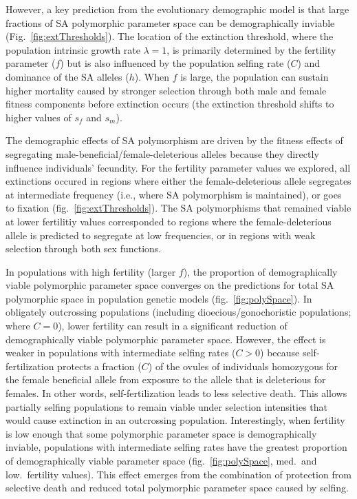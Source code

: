 \documentclass[11pt]{article}
\begin{document}
However, a key prediction from the evolutionary demographic model is that large fractions of SA polymorphic parameter space can be demographically inviable (Fig.~\ref{fig:extThresholds}). The location of the extinction threshold, where the population intrinsic growth rate $\lambda = 1$, is primarily determined by the fertility parameter ($f$) but is also influenced by the population selfing rate ($C$) and dominance of the SA alleles ($h$). When $f$ is large, the population can sustain higher mortality caused by stronger selection through both male and female fitness components before extinction occurs (the extinction threshold shifts to higher values of $s_f$ and $s_m$). 

The demographic effects of SA polymorphism are driven by the fitness effects of segregating male-beneficial/female-deleterious alleles because they directly influence individuals' fecundity. For the fertility parameter values we explored, all extinctions occured in regions where either the female-deleterious allele segregates at intermediate frequency (i.e., where SA polymorphism is maintained), or goes to fixation (fig.~\ref{fig:extThresholds}). The SA polymorphisms that remained viable at lower fertilitiy values corresponded to regions where the female-deleterious allele is predicted to segregate at low frequencies, or in regions with weak selection through both sex functions. 


In populations with high fertility (larger $f$), the proportion of demographically viable polymorphic parameter space converges on the predictions for total SA polymorphic space in population genetic models (fig.~\ref{fig:polySpace}). In obligately outcrossing populations (including dioecious/gonochoristic populations; where $C = 0$), lower fertility can result in a significant reduction of demographically viable polymorphic parameter space. However, the effect is weaker in populations with intermediate selfing rates ($C > 0$) because self-fertilization protects a fraction ($C$) of the ovules of individuals homozygous for the female beneficial allele from exposure to the allele that is deleterious for females. In other words, self-fertilization leads to less selective death. This allows partially selfing populations to remain viable under selection intensities that would cause extinction in an outcrossing population. Interestingly, when fertility is low enough that some polymorphic parameter space is demographically inviable, populations with intermediate selfing rates have the greatest proportion of demographically viable parameter space (fig.~\ref{fig:polySpace}, med.~and low.~fertility values). This effect emerges from the combination of protection from selective death and reduced total polymorphic parameter space caused by selfing. 
\end{document}
